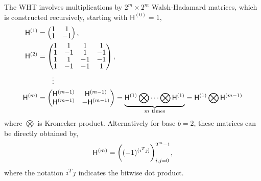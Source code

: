 \documentclass[graybox,footinfo]{svmult}
\let\vec\relax
\newcommand{\mH}{\mathsf{H}}
\begin{document}
The WHT involves multiplications by $2^m \times 2^m$ Walsh-Hadamard matrices, which is constructed recursively, starting with $\mH^{(0)} = 1$,
\begin{align}
\nonumber
\arraycolsep=1.4pt\def\arraystretch{0.9}
\mH^{(1)} &=
\begin{pmatrix}
1 & 1 \\ 1 & -1
\end{pmatrix}, \\
\nonumber
\mH^{(2)} &= 
\begin{pmatrix}
1 & 1 & 1 & 1 \\ 
1 & -1 & 1 & -1 \\
1 & 1 & -1 & -1 \\ 
1 & -1 & -1 & 1 \\
\end{pmatrix}, \\
\nonumber
& \qquad \vdots
\\
\label{eqn:hadamard_matrix}
\mH^{(m)} &= 
\begin{pmatrix}
\mH^{(m-1)} & \mH^{(m-1)} \\ \mH^{(m-1)} & -\mH^{(m-1)}
\end{pmatrix} 
= \underbrace{\mH^{(1)} \bigotimes \cdots \bigotimes \mH^{(1)}}_{m \ \text{times}} 
= \mH^{(1)} \bigotimes \mH^{(m-1)}
\end{align}
where $\bigotimes$ is Kronecker product. Alternatively for base $b=2$, these matrices can be  directly obtained by,
\begin{align*}
\mH^{(m)} %
= \bigg((-1)^{(\vec{\imath}^T \vec{\jmath})} \bigg)_{i,j=0}^{2^m-1},
\end{align*}
where the notation $\vec{\imath}^T \vec{\jmath}$ indicates the bitwise dot product. 

\end{document}
